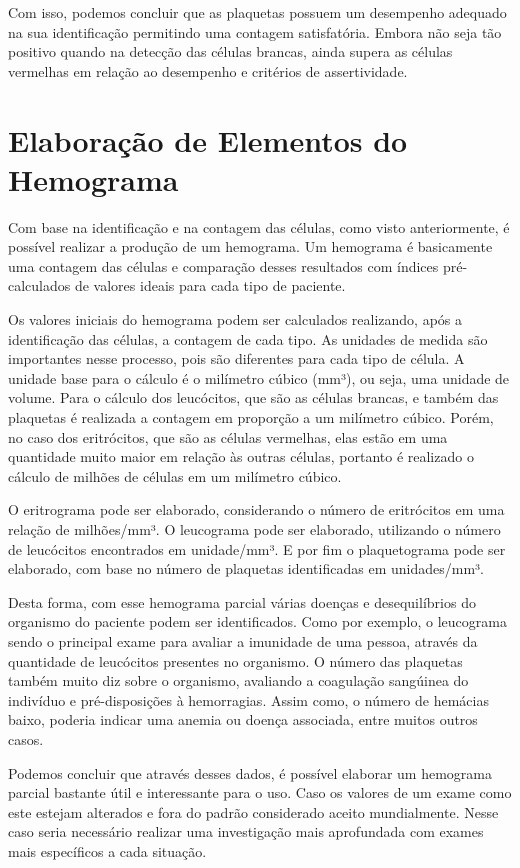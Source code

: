 Com isso, podemos concluir que as plaquetas possuem um desempenho adequado na sua identificação permitindo uma contagem satisfatória. Embora não seja tão positivo quando na detecção das células brancas, ainda supera as células vermelhas em relação ao desempenho e critérios de assertividade.

\section{Elaboração de Elementos do Hemograma}

Com base na identificação e na contagem das células, como visto anteriormente, é possível realizar a produção de um hemograma. Um hemograma é basicamente uma contagem das células e comparação desses resultados com índices pré-calculados de valores ideais para cada tipo de paciente.

Os valores iniciais do hemograma podem ser calculados realizando, após a identificação das células, a contagem de cada tipo. As unidades de medida são importantes nesse processo, pois são diferentes para cada tipo de célula. A unidade base para o cálculo é o milímetro cúbico (mm³), ou seja, uma unidade de volume. Para o cálculo dos leucócitos, que são as células brancas, e também das plaquetas é realizada a contagem em proporção a um milímetro cúbico. Porém, no caso dos eritrócitos, que são as células vermelhas, elas estão em uma quantidade muito maior em relação às outras células, portanto é realizado o cálculo de milhões de células em um milímetro cúbico.

O eritrograma pode ser elaborado, considerando o número de eritrócitos em uma relação de milhões/mm³. O leucograma pode ser elaborado, utilizando o número de leucócitos encontrados em unidade/mm³. E por fim o plaquetograma pode ser elaborado, com base no número de plaquetas identificadas em unidades/mm³.

Desta forma, com esse hemograma parcial várias doenças e desequilíbrios do organismo do paciente podem ser identificados. Como por exemplo, o leucograma sendo o principal exame para avaliar a imunidade de uma pessoa, através da quantidade de leucócitos presentes no organismo. O número das plaquetas também muito diz sobre o organismo, avaliando a coagulação sangúinea do indivíduo e pré-disposições à hemorragias. Assim como, o número de hemácias baixo, poderia indicar uma anemia ou doença associada, entre muitos outros casos.

Podemos concluir que através desses dados, é possível elaborar um hemograma parcial bastante útil e interessante para o uso. Caso os valores de um exame como este estejam alterados e fora do padrão considerado aceito mundialmente. Nesse caso seria necessário realizar uma investigação mais aprofundada com exames mais específicos a cada situação.

